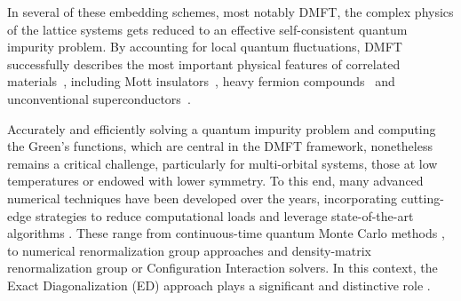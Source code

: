 \documentclass[edipack_sp.tex]{subfiles}
\begin{document}


In several of these embedding schemes, most notably DMFT, the complex physics of the lattice systems gets reduced to an effective self-consistent quantum impurity problem.
By accounting for local quantum fluctuations, DMFT successfully describes the most important physical features of correlated materials~\cite{Georges1996RMP,Kotliar2006RMP}, including Mott insulators~\cite{Georges1992PRL,Zhang1993PRLb,Rozenberg1994PRB,Kotliar1996PRB,Rozenberg1999PRL,Kotliar1999EPJB,Kotliar2000PRL,Bulla2001PRB,Capone2001PRL,Kotliar2002PRL,Limelette2003S8}, heavy fermion compounds~\cite{Shim2007N,De-Leo2008PRL,Haule2009NP,Crippa2024NC,Gleis2024PRX,Crispino2025PRL,Gleis2025PRL} and unconventional superconductors~\cite{Emery1987PRL,Caffarel1994PRL,Capone2001PRL,Capone2002Science,Toschi2005NJP,Toschi2005PRB,Haule2007PRB,Medici2014PRL,Giannetti2016AIP,Mazza2021PRB,Walsh2021PNAS}.  


%
Accurately and efficiently solving a quantum impurity problem and computing the Green's functions, which are central in the DMFT framework, nonetheless remains a critical challenge, particularly for multi-orbital systems, those 
at low temperatures or endowed with lower symmetry.
%
To this end, 
many advanced numerical techniques have been developed over the years, incorporating cutting-edge strategies to reduce computational loads and leverage state-of-the-art algorithms \cite{Bauer2011JOSMTAE,Parcollet2015CPC}. 
These range from continuous-time quantum Monte Carlo 
methods \cite{Gull2011RMP,Rubtsov2005PRB,Haule2007PRB,Seth2016CPC,Wallerberger2019CPC},
to numerical renormalization group approaches \cite{Zitko2009PRB,Bulla2001PRB,Bulla2008RMP,Debertolis2021PRB} 
and density-matrix renormalization group \cite{Zitko2009PRB,Bulla2001PRB,Bulla2008RMP,Nunez-Fernandez2025A} or Configuration Interaction \cite{Zgid2012PRB,Lu2014PRB,Go2017PRB,Bi2019CPC,Mejuto-Zaera2019PRB} solvers. 
In this context, the Exact Diagonalization (ED) approach plays a significant 
and distinctive role \cite{Caffarel1994PRL,Dolfen2006,Perroni2007PRB,Capone2007PRB,Weber2012PRB,Lu2017TEPJST,Amaricci2022CPC}.
\end{document}
